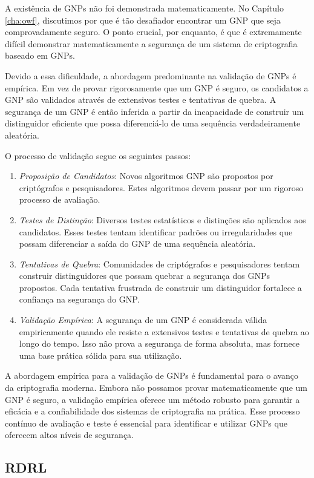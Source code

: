 A existência de GNPs não foi demonstrada matematicamente.
No Capítulo \ref{cha:owf}, discutimos por que é tão desafiador encontrar um GNP que seja comprovadamente seguro.
O ponto crucial, por enquanto, é que é extremamente difícil demonstrar matematicamente a segurança de um sistema de criptografia baseado em GNPs.

Devido a essa dificuldade, a abordagem predominante na validação de GNPs é empírica.
Em vez de provar rigorosamente que um GNP é seguro, os candidatos a GNP são validados através de extensivos testes e tentativas de quebra.
A segurança de um GNP é então inferida a partir da incapacidade de construir um distinguidor eficiente que possa diferenciá-lo de uma sequência verdadeiramente aleatória.

O processo de validação segue os seguintes passos:
\begin{enumerate}
\item[] {\em Proposição de Candidatos}:
  Novos algoritmos GNP são propostos por criptógrafos e pesquisadores.
  Estes algoritmos devem passar por um rigoroso processo de avaliação.
\item[] {\em Testes de Distinção}:
  Diversos testes estatísticos e distinções são aplicados aos candidatos.
  Esses testes tentam identificar padrões ou irregularidades que possam diferenciar a saída do GNP de uma sequência aleatória.
\item[] {\em Tentativas de Quebra}:
  Comunidades de criptógrafos e pesquisadores tentam construir distinguidores que possam quebrar a segurança dos GNPs propostos.
  Cada tentativa frustrada de construir um distinguidor fortalece a confiança na segurança do GNP.
\item[] {\em Validação Empírica}:
  A segurança de um GNP é considerada válida empiricamente quando ele resiste a extensivos testes e tentativas de quebra ao longo do tempo.
  Isso não prova a segurança de forma absoluta, mas fornece uma base prática sólida para sua utilização.
\end{enumerate}

A abordagem empírica para a validação de GNPs é fundamental para o avanço da criptografia moderna.
Embora não possamos provar matematicamente que um GNP é seguro, a validação empírica oferece um método robusto para garantir a eficácia e a confiabilidade dos sistemas de criptografia na prática.
Esse processo contínuo de avaliação e teste é essencial para identificar e utilizar GNPs que oferecem altos níveis de segurança.

\subsection{RDRL}
\label{sec:lfsr}


